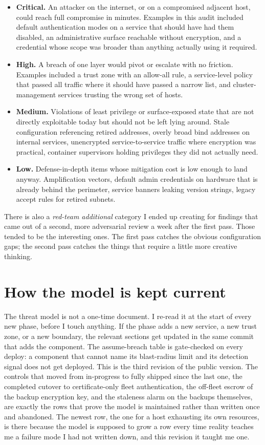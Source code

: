 \documentclass[12pt]{article}
\begin{document}
\begin{itemize}[leftmargin=18pt,itemsep=4pt]
  \item \textbf{Critical.} An attacker on the internet, or on a compromised adjacent host, could reach full compromise in minutes. Examples in this audit included default authentication modes on a service that should have had them disabled, an administrative surface reachable without encryption, and a credential whose scope was broader than anything actually using it required.
  \item \textbf{High.} A breach of one layer would pivot or escalate with no friction. Examples included a trust zone with an allow-all rule, a service-level policy that passed all traffic where it should have passed a narrow list, and cluster-management services trusting the wrong set of hosts.
  \item \textbf{Medium.} Violations of least privilege or surface-exposed state that are not directly exploitable today but should not be left lying around. Stale configuration referencing retired addresses, overly broad bind addresses on internal services, unencrypted service-to-service traffic where encryption was practical, container supervisors holding privileges they did not actually need.
  \item \textbf{Low.} Defense-in-depth items whose mitigation cost is low enough to land anyway. Amplification vectors, default admin credentials on hardware that is already behind the perimeter, service banners leaking version strings, legacy accept rules for retired subnets.
\end{itemize}

There is also a \textit{red-team additional} category I ended up creating for findings that came out of a second, more adversarial review a week after the first pass. Those tended to be the interesting ones. The first pass catches the obvious configuration gaps; the second pass catches the things that require a little more creative thinking.

\section{How the model is kept current}

The threat model is not a one-time document. I re-read it at the start of every new phase, before I touch anything. If the phase adds a new service, a new trust zone, or a new boundary, the relevant sections get updated in the same commit that adds the component. The assume-breach table is gate-checked on every deploy: a component that cannot name its blast-radius limit and its detection signal does not get deployed. This is the third revision of the public version. The controls that moved from in-progress to fully shipped since the last one, the completed cutover to certificate-only fleet authentication, the off-fleet escrow of the backup encryption key, and the staleness alarm on the backups themselves, are exactly the rows that prove the model is maintained rather than written once and abandoned. The newest row, the one for a host exhausting its own resources, is there because the model is supposed to grow a row every time reality teaches me a failure mode I had not written down, and this revision it taught me one.
\end{document}

